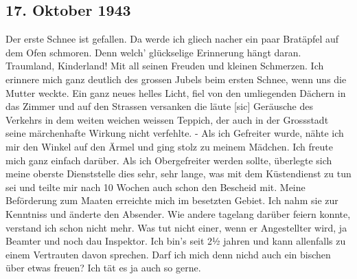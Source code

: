 \subsection{17. Oktober 1943}

Der erste Schnee ist gefallen.
Da werde ich gliech nacher ein paar Brat\"{a}pfel auf dem Ofen schmoren.
Denn welch' gl\"{u}ckselige Erinnerung h\"{a}ngt daran.
Traumland, Kinderland!
Mit all seinen Freuden und kleinen Schmerzen.
Ich erinnere mich ganz deutlich des grossen Jubels beim ersten Schnee, wenn uns die Mutter weckte.
Ein ganz neues helles Licht, fiel von den umliegenden D\"{a}chern in das Zimmer und auf den Strassen versanken die l\"{a}ute{\color{red} [sic] } Ger\"{a}usche des Verkehrs in dem weiten weichen weissen Teppich, der auch in der Grossstadt seine m\"{a}rchenhafte Wirkung nicht verfehlte.
- Als ich Gefreiter wurde, n\"{a}hte ich mir den Winkel auf den \"{A}rmel und ging stolz zu meinem M\"{a}dchen.
Ich freute mich ganz einfach dar\"{u}ber.
Als ich Obergefreiter werden sollte, \"{u}berlegte sich meine oberste Dienststelle dies sehr, sehr lange, was mit dem K\"{u}stendienst zu tun sei und teilte mir nach 10 Wochen auch schon den Bescheid mit.
Meine Bef\"{o}rderung zum Maaten erreichte mich im besetzten Gebiet.
Ich nahm sie zur Kenntniss und \"{a}nderte den Absender.
Wie andere tagelang dar\"{u}ber feiern konnte, verstand ich schon nicht mehr.
Was tut nicht einer, wenn er Angestellter wird, ja Beamter und noch dau Inspektor.
Ich bin's seit 2½ jahren und kann allenfalls zu einem Vertrauten davon sprechen.
Darf ich mich denn nichd auch ein bischen \"{u}ber etwas freuen?
Ich t\"{a}t es ja auch so gerne.

\clearpage

